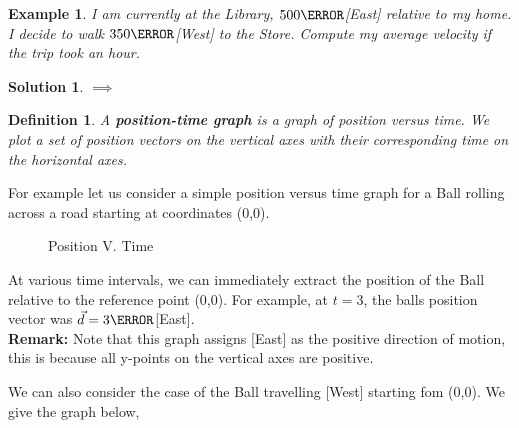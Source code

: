 \documentclass[12pt]{article}
\newcommand{\tx}[1]{\text{#1}}
\theoremstyle{break}
\newtheorem{ex}[thm]{Example}
\newtheorem*{soln}{Solution}
\newtheorem{defn}{Definition}[subsection]
\begin{document}
\begin{ex}
    I am currently at the Library, $500\m$[East] relative to my home. I decide to walk $350\m$[West] to the Store. Compute my average \emph{velocity} if the trip took an hour.
\end{ex}
\begin{soln}
$\implies$
    \vspace*{10cm}
\end{soln}



\newpage

\begin{defn}
    A \textbf{position-time graph} is a graph of position versus time. We plot a set of position vectors on the vertical axes with their corresponding time on the horizontal axes. 
\end{defn}
For example let us consider a simple position versus time graph for a Ball rolling across a road starting at coordinates (0,0). 
\begin{figure}[h]
	\centering
	\caption{Position V. Time}
	\label{fig:my-awesome-graph}
\end{figure}

At various time intervals, we can immediately extract the position of the Ball relative to the reference point (0,0). For example, at $t = 3$, the balls position vector was $\vec d = 3\m$[East].\\

\textbf{Remark: } Note that this graph assigns [East] as the positive direction of motion, this is because all y-points on the vertical axes are positive.


We can also consider the case of the Ball travelling [West] starting fom (0,0). We give the graph below,


\begin{center}
\end{center}
\end{document}
